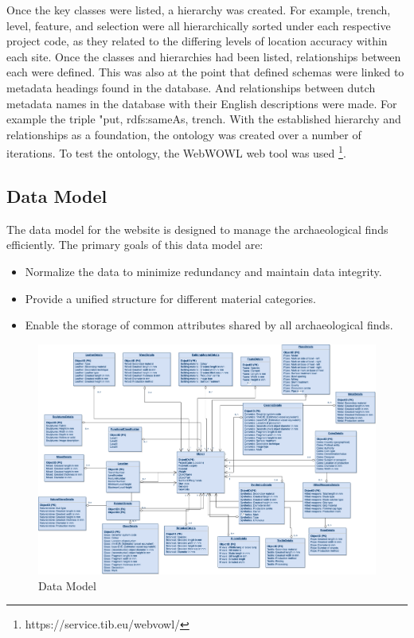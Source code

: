 Once the key classes were listed, a hierarchy was created.  For example, trench, level, feature, and selection were all hierarchically sorted under each respective project code, as they related to the differing levels of location accuracy within each site. Once the classes and hierarchies had been listed, relationships between each were defined.  This was also at the point that defined schemas were linked to metadata headings found in the database. And relationships between dutch metadata names in the database with their English descriptions were made. For example the triple "put, rdfs:sameAs, trench.  With the established hierarchy and relationships as a foundation, the ontology was created over a number of iterations. To test the ontology, the WebWOWL web tool was used \footnote{https://service.tib.eu/webvowl/}.

\subsection{Data Model}

The data model for the website is designed to manage the archaeological finds efficiently. The primary goals of this data model are:

\begin{itemize}
\item Normalize the data to minimize redundancy and maintain data integrity.
\item Provide a unified structure for different material categories.
\item Enable the storage of common attributes shared by all archaeological finds.
\end{itemize}

 \begin{figure}[!]
    \centering
    \includegraphics[width=0.8\paperwidth]{media/final data model.png}
    \caption{Data Model}
    \label{fig:data model}
\end{figure}

